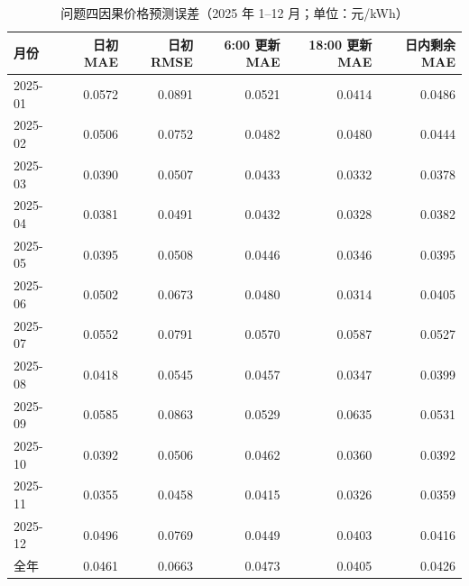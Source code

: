 \begin{table}[htbp]
\centering
\caption{问题四因果价格预测误差（2025 年 1--12 月；单位：元/kWh）}\label{tab:q4-price-error}
\small\setlength{\tabcolsep}{3pt}
\begin{tabular}{@{}lrrrrr@{}}
\toprule
月份 & 日初 MAE & 日初 RMSE & 6:00 更新 MAE & 18:00 更新 MAE & 日内剩余 MAE \\
\midrule
2025-01 & 0.0572 & 0.0891 & 0.0521 & 0.0414 & 0.0486 \\
2025-02 & 0.0506 & 0.0752 & 0.0482 & 0.0480 & 0.0444 \\
2025-03 & 0.0390 & 0.0507 & 0.0433 & 0.0332 & 0.0378 \\
2025-04 & 0.0381 & 0.0491 & 0.0432 & 0.0328 & 0.0382 \\
2025-05 & 0.0395 & 0.0508 & 0.0446 & 0.0346 & 0.0395 \\
2025-06 & 0.0502 & 0.0673 & 0.0480 & 0.0314 & 0.0405 \\
2025-07 & 0.0552 & 0.0791 & 0.0570 & 0.0587 & 0.0527 \\
2025-08 & 0.0418 & 0.0545 & 0.0457 & 0.0347 & 0.0399 \\
2025-09 & 0.0585 & 0.0863 & 0.0529 & 0.0635 & 0.0531 \\
2025-10 & 0.0392 & 0.0506 & 0.0462 & 0.0360 & 0.0392 \\
2025-11 & 0.0355 & 0.0458 & 0.0415 & 0.0326 & 0.0359 \\
2025-12 & 0.0496 & 0.0769 & 0.0449 & 0.0403 & 0.0416 \\\midrule
全年 & 0.0461 & 0.0663 & 0.0473 & 0.0405 & 0.0426 \\
\bottomrule
\end{tabular}
\end{table}
